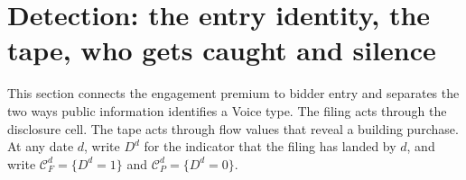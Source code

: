 
\section{Detection: the entry identity, the tape, who gets caught and silence}
\label{sec:detection}

This section connects the engagement premium to bidder entry and separates the two ways public
information identifies a Voice type. The filing acts through the disclosure cell. The tape acts
through flow values that reveal a building purchase.
At any date $d$, write $D^d$ for the indicator that the filing has landed by $d$, and write
$\mathcal C_F^d=\{D^d=1\}$ and $\mathcal C_P^d=\{D^d=0\}$.

